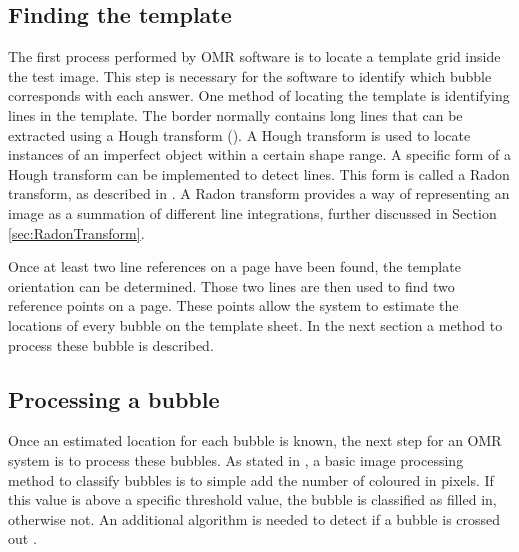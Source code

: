 \subsection{Finding the template}

The first process performed by OMR software is to locate a template grid inside the test image. This step is necessary for the software to identify which bubble corresponds with each answer. One method of locating the template is identifying lines in the template. The border normally contains long lines that can be extracted using a Hough transform (\citet{MVGI2015}). A Hough transform is used to locate instances of an imperfect object within a certain shape range. A specific form of a Hough transform can be implemented to detect lines. This form is called a Radon transform, as described in \citet{MathWorks}. A Radon transform provides a way of representing an image as a summation of different line integrations, further discussed in Section \ref{sec:RadonTransform}. 

Once at least two line references on a page have been found, the template orientation can be determined. Those two lines are then used to find two reference points on a page. These points allow the system to estimate the locations of every bubble on the template sheet. In the next section a method to process these bubble is described.

\subsection{Processing a bubble}

Once an estimated location for each bubble is known, the next step for an OMR system is to process these bubbles. As stated in \citet{MVGI2015}, a basic image processing method to classify bubbles is to simple add the number of coloured in pixels. If this value is above a specific threshold value, the bubble is classified as filled in, otherwise not. An additional algorithm is needed to detect if a bubble is crossed out .

